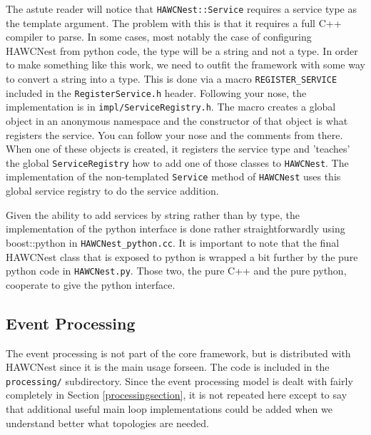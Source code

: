 \documentclass[12pt]{article}
\begin{document}
The astute reader will notice that {\tt HAWCNest::Service} 
requires a service type
as the template argument. The problem with this is that it requires a full
C++ compiler to parse. In some cases, most notably the case of configuring
HAWCNest from python code, the type will be a string and not a type. 
In order to make something like this work, we need to outfit the framework
with some way to convert a string into a type. This is done via
a macro {\tt REGISTER\_SERVICE} included in the {\tt RegisterService.h} header.
Following your nose, the implementation is in {\tt impl/ServiceRegistry.h}.
The macro creates a global object in an anonymous namespace and the
constructor of that object is what registers the service. You can follow 
your nose and the comments from there. When one of these objects is created,
it registers the service type and 'teaches' the global {\tt ServiceRegistry}
how to add one of those classes to {\tt HAWCNest}.  The implementation
of the non-templated {\tt Service} method of {\tt HAWCNest} uses this
global service registry to do the service addition.

Given the ability to add services by string rather than by type, the 
implementation of the python interface is done rather straightforwardly 
using boost::python in {\tt HAWCNest\_python.cc}.  It is important to note
that the final HAWCNest class that is exposed to python is wrapped a bit 
further by the pure python code in {\tt HAWCNest.py}. Those two, the pure
C++ and the pure python, cooperate to give the python interface.

\subsection{Event Processing}

The event processing is not part of the core framework, but is distributed
with HAWCNest since it is the main usage forseen.  The code is included
in the {\tt processing/} subdirectory.  Since the event processing model
is dealt with fairly completely in Section \ref{processingsection}, it 
is not repeated here except to say that additional useful main loop 
implementations could be added when we understand better what topologies
are needed.
\end{document}
